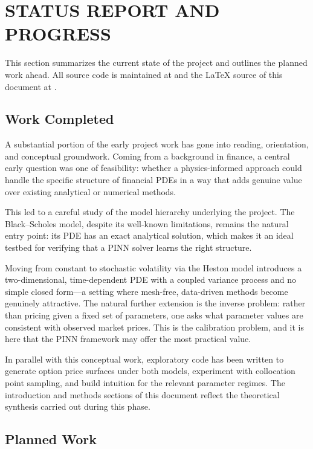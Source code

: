 \section*{STATUS REPORT AND PROGRESS}\label{section:roadmap}

This section summarizes the current state of the project and outlines the planned work ahead. All source code is maintained at \parencite{furnes2026fys5429code} and the \LaTeX{} source of this document at \parencite{furnes2026fys5429overleaf}.

\subsection*{Work Completed}

A substantial portion of the early project work has gone into reading, orientation, and conceptual groundwork. Coming from a background in finance, a central early question was one of feasibility: whether a physics-informed approach could handle the specific structure of financial PDEs in a way that adds genuine value over existing analytical or numerical methods.

This led to a careful study of the model hierarchy underlying the project. The Black--Scholes model, despite its well-known limitations, remains the natural entry point: its PDE has an exact analytical solution, which makes it an ideal testbed for verifying that a PINN solver learns the right structure. 

Moving from constant to stochastic volatility via the Heston model introduces a two-dimensional, time-dependent PDE with a coupled variance process and no simple closed form---a setting where mesh-free, data-driven methods become genuinely attractive. The natural further extension is the inverse problem: rather than pricing given a fixed set of parameters, one asks what parameter values are consistent with observed market prices. This is the calibration problem, and it is here that the PINN framework may offer the most practical value.

In parallel with this conceptual work, exploratory code has been written to generate option price surfaces under both models, experiment with collocation point sampling, and build intuition for the relevant parameter regimes. The introduction and methods sections of this document reflect the theoretical synthesis carried out during this phase.

\subsection*{Planned Work}

